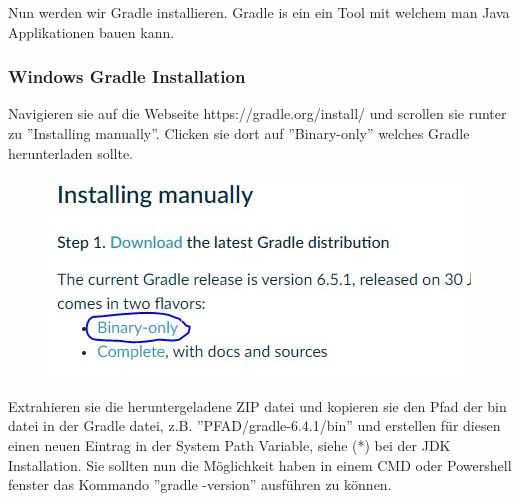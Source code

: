 \documentclass{book}
\begin{document}
Nun werden wir Gradle installieren. Gradle is ein ein Tool mit welchem man Java Applikationen bauen kann.

\subsubsection{Windows Gradle Installation}

Navigieren sie auf die Webseite https://gradle.org/install/ und scrollen sie runter zu ''Installing manually''. Clicken sie dort auf ''Binary-only'' welches Gradle herunterladen sollte.
\begin{figure}[h!]
\centering
\includegraphics[width=0.5\linewidth]{GradleDownload.JPG}
\end{figure} 

Extrahieren sie die heruntergeladene ZIP datei und kopieren sie den Pfad der bin datei in der Gradle datei, z.B. ''PFAD/gradle-6.4.1/bin'' und erstellen für diesen einen neuen Eintrag in der System Path Variable, siehe (*) bei der JDK Installation. Sie sollten nun die Möglichkeit haben in einem CMD oder Powershell fenster das Kommando ''gradle -version'' ausführen zu können.

\end{document}
